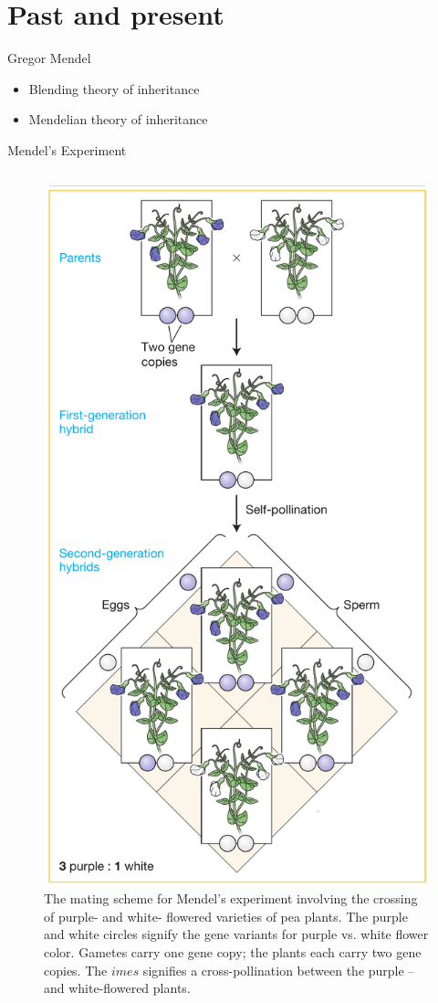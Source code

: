 \documentclass[11pt,ignorenonframetext,aspectratio=169]{beamer}
\providecommand{\tightlist}{%
  \setlength{\itemsep}{0pt}\setlength{\parskip}{0pt}}
\begin{document}
\hypertarget{past-and-present}{%
\section{Past and present}\label{past-and-present}}

\begin{frame}{Gregor Mendel}
\protect\hypertarget{gregor-mendel}{}
\begin{itemize}
\tightlist
\item
  Blending theory of inheritance
\item
  Mendelian theory of inheritance
\end{itemize}
\end{frame}

\begin{frame}{Mendel's Experiment}
\protect\hypertarget{mendels-experiment}{}
\begin{columns}[T,onlytextwidth]
  

\begin{figure}
\includegraphics[width=0.35\linewidth]{../images/mendels_experiment} \caption{The mating scheme for Mendel’s experiment involving the crossing of purple- and white- flowered varieties of pea plants. The purple and white circles signify the gene variants for purple vs. white flower color. Gametes carry one gene copy; the plants each carry two gene copies. The $  imes$ signifies a cross-pollination between the purple -- and white-flowered plants.}\label{fig:mendels-experiment}
\end{figure}
  


\end{columns}
\end{frame}
\end{document}
